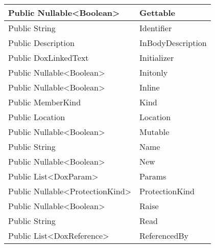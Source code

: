 \documentclass[11pt, oneside, a4paper]{book}
\begin{document}
\begin{center}
\begin{tabular}{| p{3cm} | p{12cm} | }
\hline
 Public  Nullable<Boolean> &  Gettable\hypertarget{SoftwareEngineeringTools.{}Documentation.{}DoxMember.{}Gettable}{}\\
\hline
 Public  String &  Identifier\hypertarget{SoftwareEngineeringTools.{}Documentation.{}DoxMember.{}Identifier}{}\\
\hline
 Public  Description &  InBodyDescription\hypertarget{SoftwareEngineeringTools.{}Documentation.{}DoxMember.{}InBodyDescription}{}\\
\hline
 Public  DoxLinkedText &  Initializer\hypertarget{SoftwareEngineeringTools.{}Documentation.{}DoxMember.{}Initializer}{}\\
\hline
 Public  Nullable<Boolean> &  Initonly\hypertarget{SoftwareEngineeringTools.{}Documentation.{}DoxMember.{}Initonly}{}\\
\hline
 Public  Nullable<Boolean> &  Inline\hypertarget{SoftwareEngineeringTools.{}Documentation.{}DoxMember.{}Inline}{}\\
\hline
 Public  MemberKind &  Kind\hypertarget{SoftwareEngineeringTools.{}Documentation.{}DoxMember.{}Kind}{}\\
\hline
 Public  Location &  Location\hypertarget{SoftwareEngineeringTools.{}Documentation.{}DoxMember.{}Location}{}\\
\hline
 Public  Nullable<Boolean> &  Mutable\hypertarget{SoftwareEngineeringTools.{}Documentation.{}DoxMember.{}Mutable}{}\\
\hline
 Public  String &  Name\hypertarget{SoftwareEngineeringTools.{}Documentation.{}DoxMember.{}Name}{}\\
\hline
 Public  Nullable<Boolean> &  New\hypertarget{SoftwareEngineeringTools.{}Documentation.{}DoxMember.{}New}{}\\
\hline
 Public  List<DoxParam> &  Params\hypertarget{SoftwareEngineeringTools.{}Documentation.{}DoxMember.{}Params}{}\\
\hline
 Public  Nullable<ProtectionKind> &  ProtectionKind\hypertarget{SoftwareEngineeringTools.{}Documentation.{}DoxMember.{}ProtectionKind}{}\\
\hline
 Public  Nullable<Boolean> &  Raise\hypertarget{SoftwareEngineeringTools.{}Documentation.{}DoxMember.{}Raise}{}\\
\hline
 Public  String &  Read\hypertarget{SoftwareEngineeringTools.{}Documentation.{}DoxMember.{}Read}{}\\
\hline
 Public  List<DoxReference> &  ReferencedBy\hypertarget{SoftwareEngineeringTools.{}Documentation.{}DoxMember.{}ReferencedBy}{}\\

\end{tabular}
\end{center}
\end{document}
